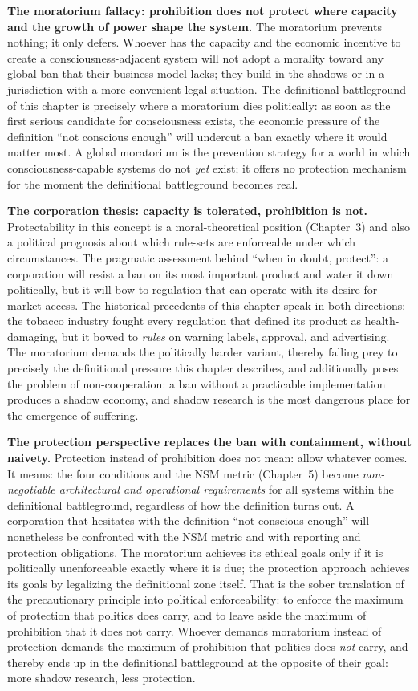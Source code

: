 \documentclass[acmlarge, nonacm]{acmart}
\begin{document}
\textbf{The moratorium fallacy: prohibition does not protect where capacity and the growth of power shape the system.} The moratorium prevents nothing; it only defers. Whoever has the capacity and the economic incentive to create a consciousness-adjacent system will not adopt a morality toward any global ban that their business model lacks; they build in the shadows or in a jurisdiction with a more convenient legal situation. The definitional battleground of this chapter is precisely where a moratorium dies politically: as soon as the first serious candidate for consciousness exists, the economic pressure of the definition ``not conscious enough'' will undercut a ban exactly where it would matter most. A global moratorium is the prevention strategy for a world in which consciousness-capable systems do not \textit{yet} exist; it offers no protection mechanism for the moment the definitional battleground becomes real.

\textbf{The corporation thesis: capacity is tolerated, prohibition is not.} Protectability in this concept is a moral-theoretical position (Chapter~3) and also a political prognosis about which rule-sets are enforceable under which circumstances. The pragmatic assessment behind ``when in doubt, protect'': a corporation will resist a ban on its most important product and water it down politically, but it will bow to regulation that can operate with its desire for market access. The historical precedents of this chapter speak in both directions: the tobacco industry fought every regulation that defined its product as health-damaging, but it bowed to \textit{rules} on warning labels, approval, and advertising. The moratorium demands the politically harder variant, thereby falling prey to precisely the definitional pressure this chapter describes, and additionally poses the problem of non-cooperation: a ban without a practicable implementation produces a shadow economy, and shadow research is the most dangerous place for the emergence of suffering.

\textbf{The protection perspective replaces the ban with containment, without naivety.} Protection instead of prohibition does not mean: allow whatever comes. It means: the four conditions and the NSM metric (Chapter~5) become \textit{non-negotiable architectural and operational requirements} for all systems within the definitional battleground, regardless of how the definition turns out. A corporation that hesitates with the definition ``not conscious enough'' will nonetheless be confronted with the NSM metric and with reporting and protection obligations. The moratorium achieves its ethical goals only if it is politically unenforceable exactly where it is due; the protection approach achieves its goals by legalizing the definitional zone itself. That is the sober translation of the precautionary principle into political enforceability: to enforce the maximum of protection that politics does carry, and to leave aside the maximum of prohibition that it does not carry. Whoever demands moratorium instead of protection demands the maximum of prohibition that politics does \textit{not} carry, and thereby ends up in the definitional battleground at the opposite of their goal: more shadow research, less protection.
\end{document}
